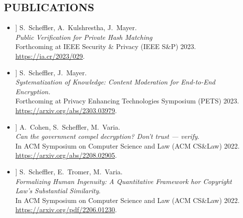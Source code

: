 \documentclass{res}
\begin{document}
\begin{resume}
\section{PUBLICATIONS}
\vspace{0.25in}

\newcommand{\csamimprovements}{[1]\xspace}
\newcommand{\eeesok}{[2]\xspace}
\newcommand{\foregoneVerif}{[3]\xspace}
\newcommand{\copyrightMDL}{[4]\xspace}
\newcommand{\turboikos}{[5]\xspace}
\newcommand{\booligero}{[6]\xspace}
\newcommand{\foregoneconclusion}{[7]\xspace}
\newcommand{\privateTranslation}{[8]\xspace}
\newcommand{\AEC}{[9]\xspace}
\newcommand{\pullingblocksJIP}{[10]\xspace}
\newcommand{\devicefingerprinting}{[11]\xspace}
\newcommand{\pullingblocks}{[12]\xspace}
\newcommand{\fairsibility}{[13]\xspace}
\newcommand{\emailspam}{[14]\xspace}

\begin{itemize}
\item[\csamimprovements] S.~Scheffler, A.~Kulshrestha, J.~Mayer. \\
\emph{Public Verification for Private Hash Matching} \\
Forthcoming at IEEE Security \& Privacy (IEEE S\&P) 2023. \\
\url{https://ia.cr/2023/029}.

\item[\eeesok] S.~Scheffler, J.~Mayer. \\
\emph{Systematization of Knowledge: Content Moderation for End-to-End Encryption.} \\
Forthcoming at Privacy Enhancing Technologies Symposium (PETS) 2023. \\
\url{https://arxiv.org/abs/2303.03979}.

\item[\foregoneVerif] A.~Cohen, S.~Scheffler, M.~Varia. \\
\emph{Can the government compel decryption?  Don't trust --- verify}. \\
In ACM Symposium on Computer Science and Law (ACM CS\&Law) 2022. \\
\url{https://arxiv.org/abs/2208.02905}.

\item[\copyrightMDL] S.~Scheffler, E.~Tromer, M.~Varia. \\
\emph{Formalizing Human Ingenuity: A Quantitative Framework hor Copyright Law's Substantial Similarity}. \\
In ACM Symposium on Computer Science and Law (ACM CS\&Law) 2022. \\
\url{https://arxiv.org/pdf/2206.01230}.


\end{itemize}
\end{resume}
\end{document}
